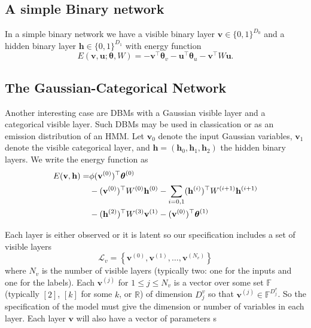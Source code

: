 \documentclass{article} %
\begin{document}
\subsection{A simple Binary network}

In a simple binary network we have a visible binary layer $\mathbf{v}\in\{0,1\}^{D_0}$ and a hidden binary layer
$\mathbf{h}\in\{0,1\}^{D_1}$ with energy function
\begin{equation}
E(\mathbf{v},\mathbf{u};\boldsymbol{\theta},W) = -\mathbf{v}^\top \boldsymbol{\theta}_v - \mathbf{u}^\top \boldsymbol{\theta}_u - \mathbf{v}^\top W \mathbf{u}.
\end{equation}

\subsection{The Gaussian-Categorical Network}

Another interesting case are DBMs with a Gaussian visible layer and a categorical visible layer.  Such DBMs may be used in classication or as an emission distribution of an HMM. Let $\mathbf{v}_0$ denote the input Gaussian variables, $\mathbf{v}_1$ denote the visible categorical
layer, and $\mathbf{h}=(\mathbf{h}_0,\mathbf{h}_1,\mathbf{h}_2)$ the hidden binary layers.  We write the energy function as
\begin{align}
E(\mathbf{v},\mathbf{h}) =& \phi(\mathbf{v}^{(0)})^\top\boldsymbol{\theta}^{(0)} \notag\\
& - (\mathbf{v}^{(0)})^\top W^{(0)} \mathbf{h}^{(0)} - \sum_{i=0,1} (\mathbf{h}^{(i)})^\top W^{(i+1)} \mathbf{h}^{(i+1)}\notag\\
& - (\mathbf{h}^{(2)})^\top W^{(3)} \mathbf{v}^{(1)} - (\mathbf{v}^{(0)})^\top \boldsymbol{\theta}^{(1)}
\end{align}



Each layer is either observed or it is latent
so our specification includes a set of visible layers
\begin{equation}
\mathcal{L}_v=\left\{\mathbf{v}^{(0)},\mathbf{v}^{(1)},\ldots,\mathbf{v}^{\left(N_v\right)}\right\}
\end{equation}
where $N_v$ is the number of visible layers (typically two: one for the inputs and one for the labels).  Each $\mathbf{v}^{(j)}$ for
$1\leq j\leq N_v$ is a vector over some set $\mathbb{F}$ (typically $[2]$, $[k]$ for some $k$, or $\mathbb{R}$) of dimension
$D^{v}_j$ so that $\mathbf{v}^{(j)}\in \mathbb{F}^{D^v_j}$. So the specification of the model must give the dimension or number of variables
in each layer.  Each layer $\mathbf{v}$ will also have a vector of parameters s  
\end{document}
